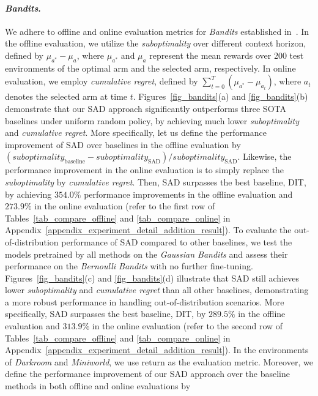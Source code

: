 \documentclass[10pt]{article}
\begin{document}
\paragraph{\textit{Bandits}.}
We adhere to offline and online evaluation metrics for \textit{Bandits} established in~\citep{lee2024supervised}. In the offline evaluation, we utilize the \textit{suboptimality} over different context horizon, defined by $\mu_{a^*} - \mu_a$, where $\mu_{a^*}$ and $\mu_a$ represent the mean rewards over 200 test environments of the optimal arm and the selected arm, respectively. In online evaluation, we employ \textit{cumulative regret}, defined by $\sum_{t=0}^T (\mu_{a^*} - \mu_{a_t})$,
where $a_t$ denotes the selected arm at time $t$.
Figures~\ref{fig_bandits}(a) and \ref{fig_bandits}(b) demonstrate that our SAD approach significantly outperforms three SOTA baselines under uniform random policy, by achieving much lower \textit{suboptimality} and \textit{cumulative regret}.
More specifically, let us define the performance improvement of SAD over baselines in the offline evaluation by
$(suboptimality_\text{baseline} - suboptimality_\text{SAD}) / suboptimality_\text{SAD}$.
Likewise, the performance improvement in the online evaluation is to simply replace the \textit{suboptimality} by \textit{cumulative regret}. Then, SAD surpasses the best baseline, DIT, by achieving $354.0\%$ performance improvements in the offline evaluation and $273.9\%$ in the online evaluation (refer to the first row of Tables~\ref{tab_compare_offline} and \ref{tab_compare_online} in Appendix~\ref{appendix_experiment_detail_addition_result}).
To evaluate the out-of-distribution performance of SAD compared to other baselines, we test the models pretrained by all methods on the \textit{Gaussian Bandits} and assess their performance on the \textit{Bernoulli Bandits} with no further fine-tuning. Figures~\ref{fig_bandits}(c) and \ref{fig_bandits}(d) illustrate that SAD still achieves lower \textit{suboptimality} and \textit{cumulative regret} than all other baselines, demonstrating a more robust performance in handling out-of-distribution scenarios.
More specifically, SAD surpasses the best baseline, DIT, by $289.5\%$ in the offline evaluation and $313.9\%$ in the online evaluation (refer to the second row of Tables~\ref{tab_compare_offline} and \ref{tab_compare_online} in Appendix~\ref{appendix_experiment_detail_addition_result}).
In the environments of \textit{Darkroom} and \textit{Miniworld}, we use return as the evaluation metric. Moreover, we define the performance improvement of our SAD approach over the baseline methods in both offline and online evaluations by
\end{document}
